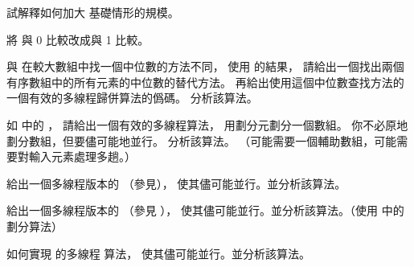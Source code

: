 \startsection[
  title={Multithreaded merge sort},
]

\startEXERCISE
試解釋如何加大  基礎情形的規模。
\stopEXERCISE

\startANSWER
將  與 0 比較改成與 1 比較。
\stopANSWER

\startEXERCISE
與  在較大數組中找一個中位數的方法不同，
使用 的結果，
請給出一個找出兩個有序數組中的所有元素的中位數的替代方法。
再給出使用這個中位數查找方法的一個有效的多線程歸併算法的僞碼。
分析該算法。
\stopEXERCISE

\startANSWER
{}
\stopANSWER

\startEXERCISE[exercise:27.3-3]
如 中的 ，
請給出一個有效的多線程算法，
用劃分元劃分一個數組。
你不必原地劃分數組，但要儘可能地並行。
分析該算法。
（\hint 可能需要一個輔助數組，可能需要對輸入元素處理多趟。）
\stopEXERCISE

\startANSWER
{}
\stopANSWER

\startEXERCISE
給出一個多線程版本的  （參見），
使其儘可能並行。並分析該算法。
\stopEXERCISE

\startANSWER
{}
\stopANSWER

\startEXERCISE\DIFFICULT
給出一個多線程版本的  （參見
），
使其儘可能並行。並分析該算法。（\hint 使用 中的劃分算法）
\stopEXERCISE

\startANSWER
{}
\stopANSWER

\startEXERCISE\DIFFICULT
如何實現 的多線程  算法，
使其儘可能並行。並分析該算法。
\stopEXERCISE

\startANSWER
{}
\stopANSWER

\stopsection
